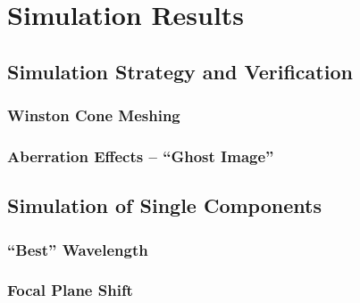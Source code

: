 \chapter{Simulation Results}

\section{Simulation Strategy and Verification}

\subsection{Winston Cone Meshing}

\subsection{Aberration Effects -- \enquote{Ghost Image}}

\section{Simulation of Single Components}

\subsection{\enquote{Best} Wavelength}

\subsection{Focal Plane Shift}